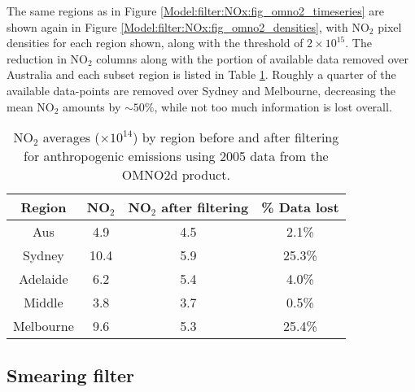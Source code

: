     The same regions as in Figure \ref{Model:filter:NOx:fig_omno2_timeseries} are shown again in Figure \ref{Model:filter:NOx:fig_omno2_densities}, with NO$_2$ pixel densities for each region shown, along with the threshold of $2 \times 10^{15}$\moleccm.
    The reduction in NO$_2$ columns along with the portion of available data removed over Australia and each subset region is listed in Table \ref{Model:filter:NOx:tab_summary}.
    Roughly a quarter of the available data-points are removed over Sydney and Melbourne, decreasing the mean NO$_2$ amounts by $\sim{50}\%$, while not too much information is lost overall.
    
    
    
    \begin{table}
      \caption{NO$_2$ averages (\moleccm $\times 10^{14}$) by region before and after filtering for anthropogenic emissions using 2005 data from the OMNO2d product.}
      \begin{tabular}{ c c c c }
        \hline
        \textbf{Region} & \textbf{NO$_2$} & \textbf{NO$_2$ after filtering} & \textbf{\% Data lost} 
        \\ \hline
        Aus       & 4.9  & 4.5  &   2.1\% \\
        Sydney    & 10.4 & 5.9  &  25.3\% \\
        Adelaide  & 6.2  & 5.4  &   4.0\% \\
        Middle    & 3.8  & 3.7  &   0.5\% \\
        Melbourne & 9.6  & 5.3  &  25.4\% \\
        \hline
      \end{tabular}
      \label{Model:filter:NOx:tab_summary}
    \end{table}
    
  \subsection{Smearing filter}
    \label{Model:filter:smearing}
    
